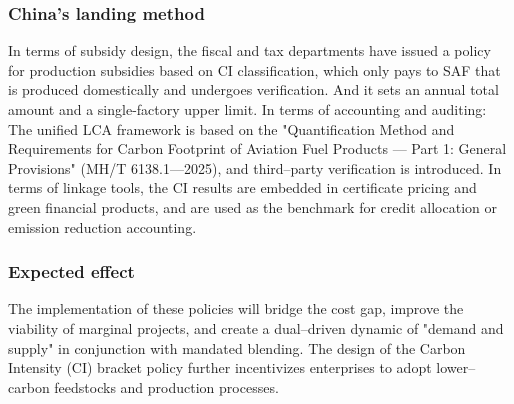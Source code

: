 \documentclass[a4paper,11pt]{article}
\begin{document}
\subsubsection{China's landing method}
In terms of subsidy design, the fiscal and tax departments have issued a policy for production subsidies based on CI classification, which only pays to SAF that is produced domestically and undergoes verification. And it sets an annual total amount and a single-factory upper limit. In terms of accounting and auditing: The unified LCA framework is based on the "Quantification Method and Requirements for Carbon Footprint of Aviation Fuel Products --- Part 1: General Provisions" (MH/T 6138.1—2025), and third--party verification is introduced. In terms of linkage tools, the CI results are embedded in certificate pricing and green financial products, and are used as the benchmark for credit allocation or emission reduction accounting.

\subsubsection{Expected effect}
The implementation of these policies will bridge the cost gap, improve the viability of marginal projects, and create a dual--driven dynamic of "demand and supply" in conjunction with mandated blending. The design of the Carbon Intensity (CI) bracket policy further incentivizes enterprises to adopt lower--carbon feedstocks and production processes.
\end{document}
